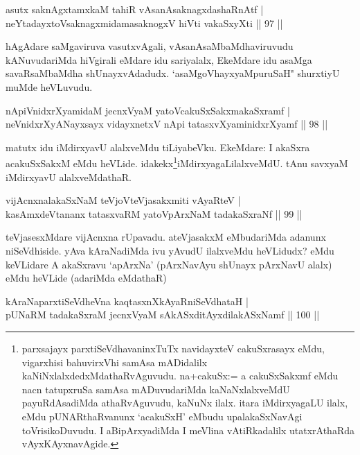 \begin{shl}
asutx saknAgxtamxkaM tahiR vAsanAsaknagxdashaRnAtf |\\
neYtadayxtoV\s saknagxmidamasaknogxV hiVti vakaSxyXti \hfill || 97 ||
\end{shl}

\begin{artha}
hAgAdare saMgaviruva vasutxvAgali, vAsanAsaMbaMdhaviruvudu kANuvudariMda hiVgirali eMdare idu sariyalalx, EkeMdare idu asaMga savaRsaMbaMdha shUnayxvAdadudx. `asaMgoVhayxyaMpuruSaH" shurxtiyU muMde heVLuvudu.
\end{artha}

\begin{shl}
nApiVnidxrXyamidaM jecnxVyaM yatoV\s cakuSxSakxmakaSxramf |\\
neVnidxrXyANayxsayx vidayxnetxV nApi tatasxvXyaminidxrXyamf \hfill || 98 ||
\end{shl}

\begin{artha}
matutx idu iMdirxyavU alalxveMdu tiLiyabeVku. EkeMdare: I akaSxra acakuSxSakxM eMdu heVLide. idakekx\footnote[1]{parxsajayx parxtiSeVdhavaninxTuTx navidayxteV cakuSxrasayx eMdu, vigarxhisi bahuvirxVhi samAsa mADidalilx kaNiNxlalxdedxMdathaRvAguvudu. na+cakuSx:= a cakuSxSakxmf eMdu nacn tatupxruSa samAsa mADuvudariMda kaNaNxlalxveMdU payuRdAsadiMda athaRvAguvudu, kaNuNx ilalx. itara iMdirxyagaLU ilalx, eMdu pUNARthaRvanunx `acakuSxH' eMbudu upalakaSxNavAgi toVrisikoDuvudu. I aBipArxyadiMda I meVlina vAtiRkadalilx utatxrAthaRda vAyxKAyxnavAgide.}iMdirxyagaLilalxveMdU. tAnu savxyaM iMdirxyavU alalxveMdathaR.
\end{artha}

\begin{shl}
vijAcnxnalakaSxNaM teVjoV\s teVjasakxmiti vAyaRteV |\\
kasAmxdeVtananx tatasxvaRM yatoV\s pArxNaM tadakaSxraNf \hfill || 99 ||
\end{shl}

\begin{artha}%
teVjasesxMdare vijAcnxna rUpavadu. ateVjasakxM eMbudariMda adanunx niSeVdhiside. yAva kAraNadiMda ivu yAvudU ilalxveMdu heVLidudx? eMdu keVLidare A akaSxravu `apArxNa' (pArxNavAyu shUnayx pArxNavU alalx) eMdu heVLide (adariMda eMdathaR)
\end{artha}


\begin{shl}
kAraNaparxtiSeVdheVna kaqtasxnXkAyaRniSeVdhataH |\\
pUNaRM tadakaSxraM jecnxVyaM sAkASxditAyxdilakASxNamf \hfill || 100 ||
\end{shl}

